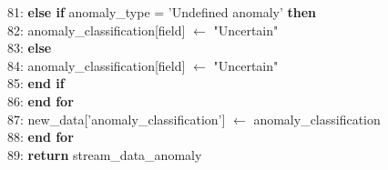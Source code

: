 \begin{breakablealgorithm}
\begin{flushleft}
81: \hspace{1em} \textbf{else if} anomaly\_type = 'Undefined anomaly' \textbf{then} \\
82: \hspace{1.5em} anomaly\_classification[field] $\gets$ "Uncertain" \\
83: \hspace{1em} \textbf{else} \\
84: \hspace{1.5em} anomaly\_classification[field] $\gets$ "Uncertain" \\
85: \hspace{1em} \textbf{end if} \\
86: \hspace{0.5em} \textbf{end for} \\
87: \hspace{0.5em} new\_data['anomaly\_classification'] $\gets$ anomaly\_classification \\
88: \textbf{end for} \\
89: \textbf{return} stream\_data\_anomaly
\end{flushleft}
\end{breakablealgorithm}
